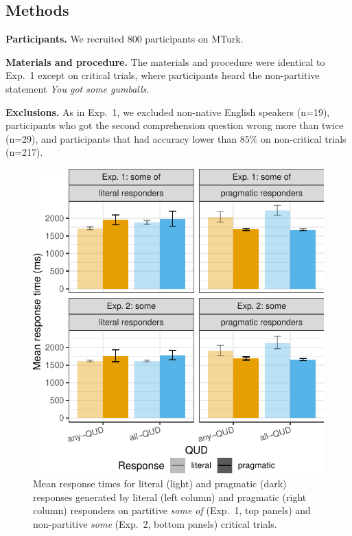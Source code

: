 \documentclass[10pt,letterpaper]{article}
\begin{document}
\subsection{Methods}

\noindent \textbf{Participants.} We recruited 800 participants on MTurk. %

\noindent \textbf{Materials and procedure.} The materials and procedure were identical to Exp.~1 except on critical trials, where participants heard the non-partitive statement \emph{You got some gumballs}.

\noindent \textbf{Exclusions.} As in Exp.~1, we excluded non-native English speakers (n=19), participants who got the second comprehension question wrong more than twice (n=29), and participants that had accuracy lower than 85\% on non-critical trials (n=217).


\begin{figure}
\centering
  \includegraphics[width=\columnwidth]{plots/responsetimes}
  \caption{Mean response times for literal (light) and pragmatic (dark) responses generated by literal (left column) and pragmatic (right column) responders on partitive \emph{some of} (Exp.~1, top panels) and non-partitive \emph{some} (Exp.~2, bottom panels) critical trials. }
  \label{fig:responsetimes}
\end{figure}
\end{document}
